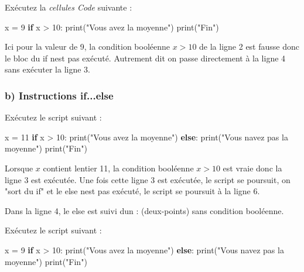 \documentclass[
  paper=a4,
  ,captions=tableheading
]{scrartcl}
\newenvironment{Shaded}{}{}
\newcommand{\BuiltInTok}[1]{\textcolor[rgb]{0.00,0.50,0.00}{#1}}
\newcommand{\ControlFlowTok}[1]{\textcolor[rgb]{0.00,0.44,0.13}{\textbf{#1}}}
\newcommand{\DecValTok}[1]{\textcolor[rgb]{0.25,0.63,0.44}{#1}}
\newcommand{\NormalTok}[1]{#1}
\newcommand{\OperatorTok}[1]{\textcolor[rgb]{0.40,0.40,0.40}{#1}}
\newcommand{\StringTok}[1]{\textcolor[rgb]{0.25,0.44,0.63}{#1}}
\begin{document}
Exécutez la \emph{cellules Code} suivante :

\begin{Shaded}
\begin{Highlighting}[]
\NormalTok{x }\OperatorTok{=} \DecValTok{9}
\ControlFlowTok{if}\NormalTok{ x }\OperatorTok{\textgreater{}} \DecValTok{10}\NormalTok{:}
    \BuiltInTok{print}\NormalTok{(}\StringTok{"Vous avez la moyenne"}\NormalTok{)}
\BuiltInTok{print}\NormalTok{(}\StringTok{"Fin"}\NormalTok{)}
\end{Highlighting}
\end{Shaded}

Ici pour la valeur de 9, la condition booléenne \(x>10\) de la ligne 2
est fausse donc le bloc du if n\textquotesingle est pas exécuté.
Autrement dit on passe directement à la ligne 4 sans exécuter la ligne
3.

\hypertarget{b-instructions-ifelse}{%
\subsubsection{b) Instructions if...else}\label{b-instructions-ifelse}}

Exécutez le script suivant :

\begin{Shaded}
\begin{Highlighting}[]
\NormalTok{x }\OperatorTok{=} \DecValTok{11}
\ControlFlowTok{if}\NormalTok{ x }\OperatorTok{\textgreater{}} \DecValTok{10}\NormalTok{:}
    \BuiltInTok{print}\NormalTok{(}\StringTok{"Vous avez la moyenne"}\NormalTok{)}
\ControlFlowTok{else}\NormalTok{:}
    \BuiltInTok{print}\NormalTok{(}\StringTok{"Vous n\textquotesingle{}avez pas la moyenne"}\NormalTok{)}
\BuiltInTok{print}\NormalTok{(}\StringTok{"Fin"}\NormalTok{)}
\end{Highlighting}
\end{Shaded}

Lorsque \(x\) contient l\textquotesingle entier 11, la condition
booléenne \(x>10\) est vraie donc la ligne 3 est exécutée. Une fois
cette ligne 3 est exécutée, le script se poursuit, on "sort du if" et le
else n\textquotesingle est pas exécuté, le script se poursuit à la ligne
6.

Dans la ligne 4, le else est suivi d\textquotesingle un : (deux-points)
sans condition booléenne.

Exécutez le script suivant :

\begin{Shaded}
\begin{Highlighting}[]
\NormalTok{x }\OperatorTok{=} \DecValTok{9}
\ControlFlowTok{if}\NormalTok{ x }\OperatorTok{\textgreater{}} \DecValTok{10}\NormalTok{:}
    \BuiltInTok{print}\NormalTok{(}\StringTok{"Vous avez la moyenne"}\NormalTok{)}
\ControlFlowTok{else}\NormalTok{:}
    \BuiltInTok{print}\NormalTok{(}\StringTok{"Vous n\textquotesingle{}avez pas la moyenne"}\NormalTok{)}
\BuiltInTok{print}\NormalTok{(}\StringTok{"Fin"}\NormalTok{)}
\end{Highlighting}
\end{Shaded}
\end{document}
